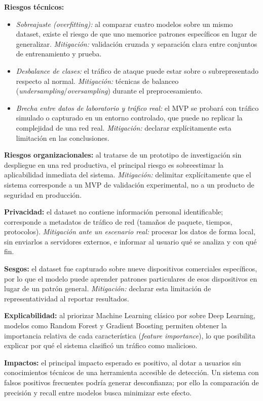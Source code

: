 \documentclass[11pt,a4paper]{article}
\begin{document}
\textbf{Riesgos técnicos:}
\begin{itemize}
    \item \textit{Sobreajuste (overfitting):} al comparar cuatro modelos sobre un mismo dataset, existe el riesgo de que uno memorice patrones específicos en lugar de generalizar. \textit{Mitigación:} validación cruzada y separación clara entre conjuntos de entrenamiento y prueba.
    \item \textit{Desbalance de clases:} el tráfico de ataque puede estar sobre o subrepresentado respecto al normal. \textit{Mitigación:} técnicas de balanceo (\textit{undersampling}/\textit{oversampling}) durante el preprocesamiento.
    \item \textit{Brecha entre datos de laboratorio y tráfico real:} el MVP se probará con tráfico simulado o capturado en un entorno controlado, que puede no replicar la complejidad de una red real. \textit{Mitigación:} declarar explícitamente esta limitación en las conclusiones.
\end{itemize}

\textbf{Riesgos organizacionales:} al tratarse de un prototipo de investigación sin despliegue en una red productiva, el principal riesgo es sobreestimar la aplicabilidad inmediata del sistema. \textit{Mitigación:} delimitar explícitamente que el sistema corresponde a un MVP de validación experimental, no a un producto de seguridad en producción.

\textbf{Privacidad:} el dataset no contiene información personal identificable; corresponde a metadatos de tráfico de red (tamaños de paquete, tiempos, protocolos). \textit{Mitigación ante un escenario real:} procesar los datos de forma local, sin enviarlos a servidores externos, e informar al usuario qué se analiza y con qué fin.

\textbf{Sesgos:} el dataset fue capturado sobre nueve dispositivos comerciales específicos, por lo que el modelo puede aprender patrones particulares de esos dispositivos en lugar de un patrón general. \textit{Mitigación:} declarar esta limitación de representatividad al reportar resultados.

\textbf{Explicabilidad:} al priorizar Machine Learning clásico por sobre Deep Learning, modelos como Random Forest y Gradient Boosting permiten obtener la importancia relativa de cada característica (\textit{feature importance}), lo que posibilita explicar por qué el sistema clasificó un tráfico como malicioso.

\textbf{Impactos:} el principal impacto esperado es positivo, al dotar a usuarios sin conocimientos técnicos de una herramienta accesible de detección. Un sistema con falsos positivos frecuentes podría generar desconfianza; por ello la comparación de precisión y recall entre modelos busca minimizar este efecto.
\end{document}
